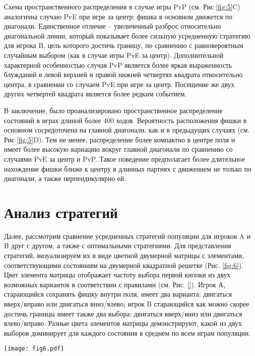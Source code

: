 Схема пространственного распределения в случае игры PvP (см. Рис \ref{fig:5}C) аналогична случаю PvE при игре за центр: 
фишка в основном движется по диагонали. Единственное отличие -- увеличенный разброс относительно диагональной линии, 
который показывает более сильную усредненную стратегию для игрока B, цель которого достичь границу, 
по сравнению с равновероятным случайным выбором (как в случае игры PvE за центр).
Дополнительной характерной особенностью случая PvP является более яркая выраженность
блужданий в левой верхней и правой нижней четвертях квадрата относительно центра, в сравнении со случаем PvE при игре за центр.
Посещение же двух других четвертей квадрата является более редким событием.

В заключение, было проанализировано пространственное распределение состояний в играх длиной более 400 ходов. 
Вероятность расположения фишки в основном сосредоточена на главной диагонали, как и в предыдущих случаях (см. Рис \ref{fig:5}D). 
Тем не менее, распределение более компактно в центре поля и имеет более высокую вариацию вокруг главной диагонали 
по сравнению со случаями PvE за центр и PvP. Такое поведение предполагает более длительное нахождение фишки ближе к центру 
в длинных партиях с движением не только по диагонали, а также перпендикулярно ей.


\section{Анализ стратегий}\label{sec:ch3/sec5}

Далее, рассмотрим сравнение усредненных стратегий популяции для игроков A и B друг с другом, а также с оптимальными стратегиями. 
Для представления стратегий, визуализируем их в виде цветной двумерной матрицы с элементами, 
соответствующими состояниям на двумерной квадратной решетке (Рис. \ref{fig:6}). 
Цвет элемента матрицы отображает частоту выбора первой кнопки из двух возможных вариантов в соответствии с правилами (см. Рис. \ref{}). 
Игрок А, старающийся сохранять фишку внутри поля, имеет два варианта: двигаться вверх/вправо или двигаться вниз/влево; 
игрок B старающийся как можно скорее достичь границы имеет также два выбора: двигаться вверх/вниз или двигаться влево/вправо. 
Разные цвета элементов матрицы демонстрируют, какой из двух выборов доминирует для каждого состояния в среднем по всем играм популяции.

\begin{figure*}[t]
    \begin{center}
    \texttt{[image: fig6.pdf]}
    \caption{
        Визуализация средних популяционных стратегий для разных режимов, полученных в эксперименте. 
        Цвет ячеек отображает частоту выбора первой чистой стратегии: для игры за центр (A, B, C) и для игры за границу (D, E, F).
    }  
    \label{fig:6}
    \end{center}
\end{figure*}

